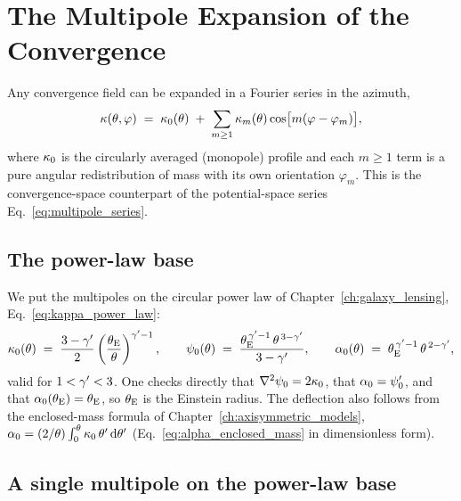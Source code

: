 \section{The Multipole Expansion of the Convergence}
\label{sec:mu_formalism}

Any convergence field can be expanded in a Fourier series in the
azimuth,
\begin{equation}
    \kappa(\theta,\varphi) \;=\; \kappa_0(\theta)
    \;+\; \sum_{m\ge1}\kappa_m(\theta)\cos\!\big[m(\varphi-\varphi_m)\big],
    \label{eq:mu_kappa_expansion}
\end{equation}
where $\kappa_0$ is the circularly averaged (monopole) profile and
each $m\ge1$ term is a pure angular redistribution of mass with its own
orientation $\varphi_m$.  This is the convergence-space counterpart of
the potential-space series Eq.~\eqref{eq:multipole_series}.

\subsection{The power-law base}
\label{sec:mu_base}

We put the multipoles on the circular power law of
Chapter~\ref{ch:galaxy_lensing}, Eq.~\eqref{eq:kappa_power_law}:
\begin{equation}
    \kappa_0(\theta) \;=\; \frac{3-\gamma'}{2}
    \left(\frac{\theta_{\mathrm{E}}}{\theta}\right)^{\gamma'-1},
    \qquad
    \psi_0(\theta) \;=\; \frac{\theta_{\mathrm{E}}^{\,\gamma'-1}\,\theta^{\,3-\gamma'}}{3-\gamma'},
    \qquad
    \alpha_0(\theta) \;=\; \theta_{\mathrm{E}}^{\,\gamma'-1}\,\theta^{\,2-\gamma'},
    \label{eq:mu_monopole}
\end{equation}
valid for $1<\gamma'<3$.  One checks directly that $\nabla^2\psi_0 =
2\kappa_0$, that $\alpha_0 = \psi_0'$, and that $\alpha_0(\theta_{\mathrm{E}}) =
\theta_{\mathrm{E}}$, so $\theta_{\mathrm{E}}$ is the Einstein radius.  The deflection also
follows from the enclosed-mass formula of
Chapter~\ref{ch:axisymmetric_models}, $\alpha_0 = (2/\theta)\int_0^\theta
\kappa_0\,\theta'\,\dd\theta'$ (Eq.~\eqref{eq:alpha_enclosed_mass} in
dimensionless form).

\subsection{A single multipole on the power-law base}
\label{sec:mu_single}

